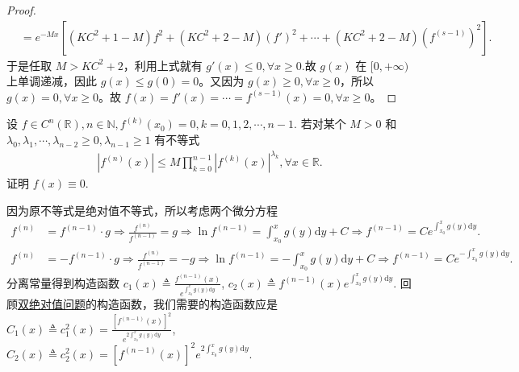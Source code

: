 \documentclass[../../main.tex]{subfiles}%
\begin{document}
\begin{proof}
\begin{align*}
&=e^{-Mx}\left[ \left( KC^2+1-M \right) f^2+\left( KC^2+2-M \right) \left( f' \right) ^2+\cdots +\left( KC^2+2-M \right) \left( f^{\left( s-1 \right)} \right) ^2 \right] .
\end{align*}
于是任取 $M>KC^2+2$，利用上式就有 $g'\left( x \right) \leqslant 0,\forall x\geqslant  0$.故 $g\left( x \right)$ 在 $[0,+\infty )$ 上单调递减，因此 $g\left( x \right) \leqslant g\left( 0 \right) =0$。又因为 $g\left( x \right) \geqslant 0,\forall x\geqslant 0$，所以 $g\left( x \right) =0,\forall x\geqslant 0$。故
$f\left( x \right) =f'\left( x \right) =\cdots =f^{\left( s-1 \right)}\left( x \right) =0,\forall x\geqslant 0$。

\end{proof}

\begin{example}
设 $f \in C^n(\mathbb{R}), n \in \mathbb{N}, f^{(k)}(x_0) = 0, k = 0, 1, 2, \cdots, n - 1$. 若对某个 $M > 0$ 和 $\lambda_0, \lambda_1, \cdots, \lambda_{n - 2} \geqslant  0, \lambda_{n - 1} \geqslant  1$ 有不等式
\begin{align*}
|f^{(n)}(x)| \leqslant  M \prod_{k = 0}^{n - 1} |f^{(k)}(x)|^{\lambda_k}, \forall x \in \mathbb{R}.
\end{align*}
证明 $f(x) \equiv 0$.
\end{example}
\begin{note}
因为原不等式是绝对值不等式，所以考虑两个微分方程
\begin{align*}
f^{(n)} &= f^{(n-1)} \cdot g \Rightarrow \frac{f^{(n)}}{f^{(n-1)}} = g \Rightarrow \ln f^{(n-1)} = \int_{x_0}^x g(y) \mathrm{d}y + C \Rightarrow f^{(n-1)} = C e^{\int_{x_0}^x g(y) \mathrm{d}y}.
\end{align*}
\begin{align*}
f^{(n)} &= -f^{(n-1)} \cdot g \Rightarrow \frac{f^{(n)}}{f^{(n-1)}} = -g \Rightarrow \ln f^{(n-1)} = -\int_{x_0}^x g(y) \mathrm{d}y + C \Rightarrow f^{(n-1)} = C e^{-\int_{x_0}^x g(y) \mathrm{d}y}.
\end{align*}
分离常量得到构造函数 $c_1(x) \triangleq \frac{f^{(n-1)}(x)}{e^{\int_{x_0}^x g(y) \mathrm{d}y}}$, $c_2(x) \triangleq f^{(n-1)}(x) e^{\int_{x_0}^x g(y) \mathrm{d}y}$.
回顾\hyperref[subsection:双绝对值问题]{双绝对值问题}的构造函数，我们需要的构造函数应是 $C_1(x) \triangleq c_1^2(x) = \frac{[f^{(n-1)}(x)]^2}{e^{2\int_{x_0}^x g(y) \mathrm{d}y}}$, $C_2(x) \triangleq c_2^2(x) = [f^{(n-1)}(x)]^2 e^{2\int_{x_0}^x g(y) \mathrm{d}y}$.
\end{note}
\end{document}
